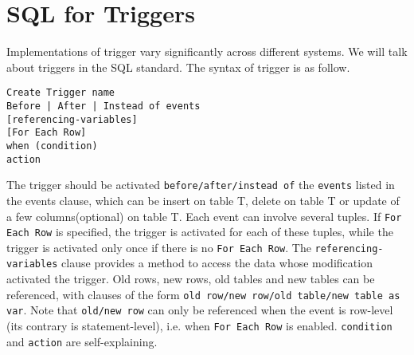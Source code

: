 \section{SQL for Triggers}
Implementations of trigger vary significantly across different systems. We will talk about triggers in the SQL standard. The syntax of trigger is as follow.
\begin{lstlisting}
Create Trigger name 
Before | After | Instead of events
[referencing-variables]
[For Each Row]
when (condition)
action
\end{lstlisting}
The trigger should be activated \texttt{before/after/instead of} the \texttt{events} listed in the events clause, which can be insert on table T, delete on table T or update of a few columns(optional) on table T. Each event can involve several tuples. If \texttt{For Each Row} is specified, the trigger is activated for each of these tuples, while the trigger is activated only once if there is no \texttt{For Each Row}. The \texttt{referencing-variables} clause provides a method to access the data whose modification activated the trigger. Old rows, new rows, old tables and new tables can be referenced, with clauses of the form \texttt{old row/new row/old table/new table as var}. Note that \texttt{old/new row} can only be referenced when the event is row-level (its contrary is statement-level), i.e. when \texttt{For Each Row} is enabled. \texttt{condition} and \texttt{action} are self-explaining. 

